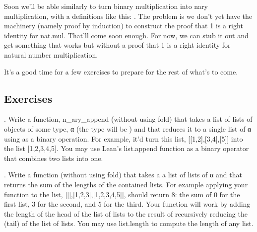 \documentclass[letterpaper,10pt,english]{sphinxmanual}
\begin{document}
\sphinxAtStartPar
Soon we’ll be able similarly to turn binary multiplication
into n\sphinxhyphen{}ary multiplication, with a definitions like this:
. The
problem is we don’t yet have the machinery (namely proof by
induction) to construct the proof that 1 is a right identity
for nat.mul. That’ll come soon enough. For now, we can stub
it out and get something that works but without a proof that
1 is a right identity for natural number multiplication.

\begin{sphinxVerbatim}[commandchars=\\\{\}]
      
  \PYG{o}{[}\PYG{o}{]}
\end{sphinxVerbatim}

\sphinxAtStartPar
It’s a good time for a few exercises to prepare for the rest
of what’s to come.


\subsection{Exercises}
\label{\detokenize{A_03_Recursive_Types:id4}}
. Write a function, n\_ary\_append (without using fold) that
takes a list of lists of objects of some type, α (the type will
be ) and that reduces it to a single list of α
using  as a binary operation. For example, it’d
turn this list, {[}{[}1,2{]},{[}3,4{]},{[}5{]}{]} into the list {[}1,2,3,4,5{]}.
You may use Lean’s list.append function as a binary operator
that combines two lists into one.

. Write a function (without using fold) that takes a a list
of lists of α and that returns the sum of the lengths of the
contained lists. For example applying your function to the
list, {[}{[}{]},{[}1,2,3{]},{[}1,2,3,4,5{]}{]}, should return 8: the sum of
0 for the first list, 3 for the second, and 5 for the third.
Your function will work by adding the length of the head of
the list of lists to the result of recursively reducing the
 (tail) of the list of lists. You may use list.length
to compute the length of any list.
\end{document}
